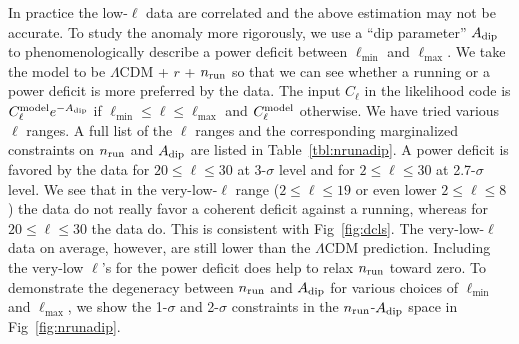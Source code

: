 \documentclass[a4paper,11pt]{article}
\begin{document}
In practice the low-$\ell$ data are correlated and the above estimation may not be accurate. To study the anomaly more rigorously, we use a ``dip parameter'' $A_{\rm dip}$ to phenomenologically describe a power deficit between $\ell_{\min}$ and $\ell_{\max}$. We take the model to be $\Lambda$CDM + $r$ + $n_{\rm run}$ so that we can see whether a running or a power deficit is more preferred by the data. The input $C_{\ell}$ in the likelihood code is $C_\ell^{\rm model}e^{-A_{\rm dip}}$ if $\ell_{\min}\le \ell \le \ell_{\max}$ and $C_\ell^{\rm model}$ otherwise. We have tried various $\ell$ ranges. A full list of the $\ell$ ranges and the corresponding marginalized constraints on $n_{\rm run}$ and $A_{\rm dip}$ are listed in Table~\ref{tbl:nrunadip}. A power deficit is favored by the data for $20\le \ell \le 30$ at $3$-$\sigma$ level and for $2\le \ell \le 30$ at 2.7-$\sigma$ level. We see that in the very-low-$\ell$ range ($2\le \ell \le 19$ or even lower $2\le \ell \le 8$ ) the data do not really favor a coherent deficit against a running, whereas for $20\le\ell\le30$ the data do. This is consistent with Fig~\ref{fig:dcls}. The very-low-$\ell$ data on average, however, are still lower than the $\Lambda$CDM prediction. Including the very-low $\ell$'s for the power deficit does help to relax $n_{\rm run}$ toward zero. To demonstrate the degeneracy between $n_{\rm run}$ and $A_{\rm dip}$ for various choices of $\ell_{\min}$ and $\ell_{\max}$, we show the 1-$\sigma$ and 2-$\sigma$ constraints in the $n_{\rm run}$-$A_{\rm dip}$ space in Fig~\ref{fig:nrunadip}. 
\end{document}
